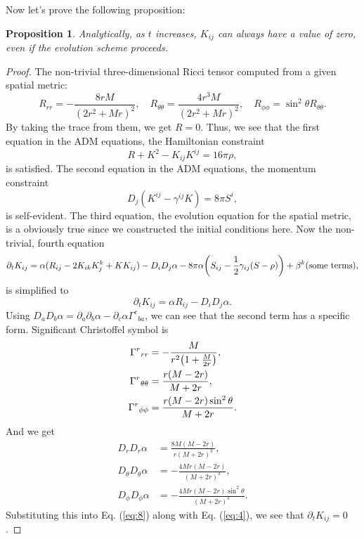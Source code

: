 \documentclass{article}
\newtheorem{proposition}[theorem]{Proposition}
\begin{document}
	Now let's prove the following proposition:
	\begin{proposition}
		Analytically, as $t$ increases, $K_{ij}$ can always have a value of zero, even if the evolution scheme proceeds.
	\end{proposition}
	\begin{proof}
		The non-trivial three-dimensional Ricci tensor computed from a given spatial metric:
		\begin{equation}
			R_{rr} = - \frac{8rM}{(2r^2+Mr)^2}, \quad R_{\theta\theta} = \frac{4r^3M}{(2r^2+Mr)^2}, \quad R_{\phi\phi} = \sin^2\theta R_{\theta\theta}.\label{eq:4}
		\end{equation}
		By taking the trace from them, we get $R=0$. Thus, we see that the first equation in the ADM equations, the Hamiltonian constraint
		\begin{equation}
			R+K^2 - K_{ij}K^{ij} = 16 \pi \rho,
		\end{equation}
		is satisfied. The second equation in the ADM equations, the momentum constraint
		\begin{equation}
			D_j (K^{ij} - \gamma^{ij} K) = 8 \pi S^i,
		\end{equation}
		is self-evident. The third equation, the evolution equation for the spatial metric, is a obviously true since we constructed the initial conditions here. Now the non-trivial, fourth equation
		\begin{equation}
			\partial_t K_{ij} = \alpha ( R_{ij} - 2K_{ik} K^{k}_j + KK_{ij}) - D_i D_j \alpha - 8 \pi \alpha \qty( S_{ij} - \frac{1}{2}\gamma_{ij} (S-\rho)) + \beta^k(\text{some terms}),
		\end{equation}
		is simplified to
		\begin{equation}
			\partial_t K_{ij} = \alpha R_{ij} - D_i D_j \alpha .\label{eq:8}
		\end{equation}
		Using $D_aD_b\alpha = \partial_a\partial_b \alpha - \partial_c \alpha \Gamma^c{}_{ba}$, we can see that the second term has a specific form.
		Significant Christoffel symbol is
		\begin{align}
			\Gamma^{r}{}_{rr} &= - \frac{M}{r^2 \qty(1 + \frac{M}{2r})},\\
			\Gamma^{r}{}_{\theta\theta} &= \frac{r(M-2r)}{M+2r},\\
			\Gamma^{r}{}_{\phi\phi} &= \frac{r(M-2r)\sin^2\theta}{M+2r}.
		\end{align}
		And we get
		\begin{align}
			D_rD_r\alpha &= \frac{8M(M-2r)}{r(M+2r)^3},\\
			D_\theta D_\theta \alpha&= - \frac{4 M r \left(M - 2 r\right)}{\left(M + 2 r\right)^{3}},\\
			D_\phi D_\phi \alpha&= - \frac{4 M r \left(M - 2 r\right) \sin^{2}{\theta}}{\left(M + 2 r\right)^{3}}.
		\end{align}
		Substituting this into Eq. (\ref{eq:8}) along with Eq. (\ref{eq:4}), we see that $\partial_{t}K_{ij}=0$.
	\end{proof}
\end{document}
